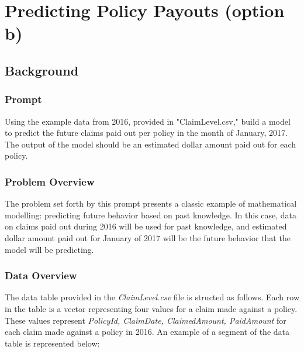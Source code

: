 \documentclass[12pt,letterpaper,titlepage]{article}
\begin{document}
		
				 
	\newpage
	\section{Predicting Policy Payouts (option b)}
		
		\subsection{Background}
		
			\subsubsection*{Prompt}
			Using the example data from 2016, provided in "ClaimLevel.csv," build a model to predict the future claims paid out per policy in the month of January, 2017. The output of the model should be an estimated dollar amount paid out for each policy.
			
			\subsubsection*{Problem Overview}
			The problem set forth by this prompt presents a classic example of mathematical modelling: predicting future behavior based on past knowledge. In this case, data on claims paid out during 2016 will be used for past knowledge, and estimated dollar amount paid out for January of 2017 will be the future behavior that the model will be predicting.
			
			\subsubsection*{Data Overview}
			The data table provided in the \emph{ClaimLevel.csv} file is structed as follows. Each row in the table is a vector representing four values for a claim made against a policy. These values represent \emph{PolicyId, ClaimDate, ClaimedAmount, PaidAmount} for each claim made against a policy in 2016. An example of a segment of the data table is represented below:
			
\end{document}

